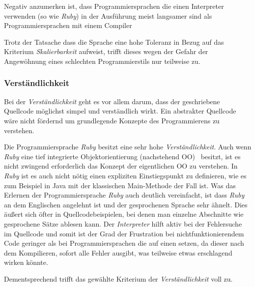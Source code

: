 \documentclass[12pt,DIV=14, version=first, BCOR=10mm,a4paper,twoside,parskip=half-,headsepline,headinclude]{scrartcl}
\begin{document}
\begin{flushleft}
Negativ anzumerken ist, dass Programmiersprachen die einen Interpreter verwenden (so wie \textit{\glqq Ruby\grqq}) in der Ausführung meist langsamer sind als Programmiersprachen mit einem Compiler

Trotz der Tatsache dass die Sprache eine hohe Toleranz in Bezug auf das Kriterium \textit{Skalierbarkeit} aufweist, trifft dieses wegen der Gefahr der Angewöhnung eines schlechten Programmierstils nur teilweise zu.

\end{flushleft}

\subsubsection{Verständlichkeit} \label{Verständlichkeit}
\begin{flushleft}
Bei der \textit{Verständlichkeit} geht es vor allem darum, dass der geschriebene Quellcode möglichst simpel und verständlich wirkt. Ein abstrakter Quellcode wäre nicht fördernd um grundlegende Konzepte des Programmierens zu verstehen.

Die Programmiersprache \textit{\glqq Ruby\grqq} besitzt eine sehr hohe \textit{Verständlichkeit}. Auch wenn \textit{\glqq Ruby\grqq} eine tief integrierte Objektorientierung (nachstehend \glqq OO\grqq) \, besitzt, ist es nicht zwingend erforderlich das Konzept der eigentlichen OO zu verstehen. In \textit{\glqq Ruby\grqq} ist es auch nicht nötig einen expliziten Einstiegspunkt zu definieren, wie es zum Beispiel in Java mit der klassischen Main-Methode der Fall ist. Was das Erlernen der Programmiersprache \textit{\glqq Ruby\grqq} auch deutlich vereinfacht, ist dass \textit{\glqq Ruby\grqq} an dem Englischen angelehnt ist und der gesprochenen Sprache sehr ähnelt. Dies äußert sich öfter in Quellcodebeispielen, bei denen man einzelne Abschnitte wie gesprochene Sätze ablesen kann. Der \textit{Interpreter} hilft aktiv bei der Fehlersuche im Quellcode und somit ist der Grad der Frustration bei nichtfunktionierendem Code geringer als bei Programmiersprachen die auf einen  setzen, da dieser nach dem Kompilieren, sofort alle Fehler ausgibt, was teilweise etwas erschlagend wirken könnte.

Dementsprechend trifft das gewählte Kriterium der \textit{Verständlichkeit} voll zu.
\end{flushleft}
\end{document}
